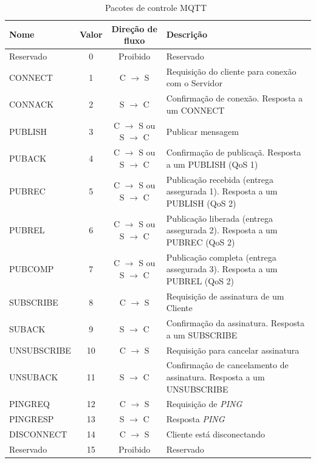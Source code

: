 \begin{table}[!ht]
	\centering\tiny{
		\caption{Pacotes de controle MQTT~\cite{mqttv3.1.1}} \label{tab:mqtt_packets}}
\begin{tabular}{|l|c|c|l|}
	\hline 
	\textbf{Nome} & \textbf{Valor} & \textbf{Direção de fluxo} & Descrição \\ 
	\hline 
	Reservado & 0 & Proibido & Reservado \\ 
	\hline 
	CONNECT & 1 & C $\rightarrow$ S & Requisição do cliente para conexão com o Servidor \\ 
	\hline 
	CONNACK & 2 & S $\rightarrow$ C & Confirmação de conexão. Resposta a um CONNECT \\ 
	\hline 
	PUBLISH & 3 & C $\rightarrow$ S ou S $\rightarrow$ C & Publicar mensagem \\ 
	\hline 
	PUBACK & 4 & C $\rightarrow$ S ou S $\rightarrow$ C & Confirmação de publicaçã. Resposta a um PUBLISH (QoS 1) \\ 
	\hline 
	PUBREC & 5 & C $\rightarrow$ S ou S $\rightarrow$ C & Publicação recebida (entrega assegurada 1). Resposta a um PUBLISH (QoS 2) \\ 
	\hline 
	PUBREL & 6 & C $\rightarrow$ S ou S $\rightarrow$ C & Publicação liberada (entrega assegurada 2). Resposta a um PUBREC (QoS 2) \\ 
	\hline 
	PUBCOMP & 7 & C $\rightarrow$ S ou S $\rightarrow$ C & Publicação completa (entrega assegurada 3). Resposta a um PUBREL (QoS 2) \\ 
	\hline 
	SUBSCRIBE & 8 & C $\rightarrow$ S & Requisição de assinatura de um Cliente \\ 
	\hline 
	SUBACK & 9 & S $\rightarrow$ C & Confirmação da assinatura. Resposta a um SUBSCRIBE \\ 
	\hline 
	UNSUBSCRIBE & 10 & C $\rightarrow$ S & Requisição para cancelar assinatura \\ 
	\hline 
	UNSUBACK & 11 & S $\rightarrow$ C & Confirmação de cancelamento de assinatura. Resposta a um UNSUBSCRIBE \\ 
	\hline 
	PINGREQ & 12 & C $\rightarrow$ S & Requisição de \textit{PING} \\ 
	\hline 
	PINGRESP & 13 & S $\rightarrow$ C & Resposta \textit{PING} \\ 
	\hline 
	DISCONNECT & 14 & C $\rightarrow$ S & Cliente está disconectando \\ 
	\hline 
	Reservado & 15 & Proibido & Reservado \\ 
	\hline 
\end{tabular} 
\end{table} 

